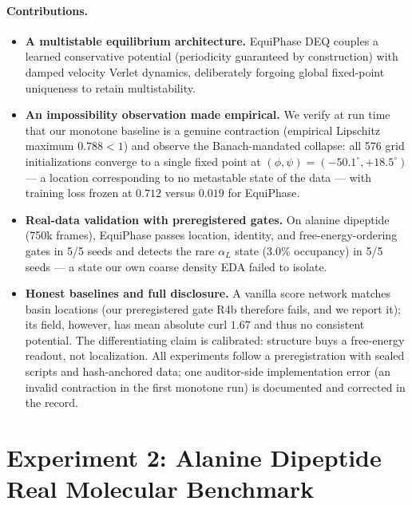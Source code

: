 \documentclass{article}
\begin{document}
\paragraph{Contributions.}
\begin{itemize}
\item \textbf{A multistable equilibrium architecture.} EquiPhase DEQ couples
a learned conservative potential (periodicity guaranteed by construction)
with damped velocity Verlet dynamics, deliberately forgoing global
fixed-point uniqueness to retain multistability.
\item \textbf{An impossibility observation made empirical.} We verify at run
time that our monotone baseline is a genuine contraction (empirical Lipschitz
maximum $0.788 < 1$) and observe the Banach-mandated collapse: all 576 grid
initializations converge to a single fixed point at
$(\phi,\psi)=(-50.1^\circ, +18.5^\circ)$ — a location corresponding to no
metastable state of the data — with training loss frozen at $0.712$ versus
$0.019$ for EquiPhase.
\item \textbf{Real-data validation with preregistered gates.} On alanine
dipeptide (750k frames), EquiPhase passes location, identity, and
free-energy-ordering gates in 5/5 seeds and detects the rare
$\alpha_L$ state (3.0\% occupancy) in 5/5 seeds — a state our own
coarse density EDA failed to isolate.
\item \textbf{Honest baselines and full disclosure.} A vanilla score network
matches basin locations (our preregistered gate R4b therefore fails, and we
report it); its field, however, has mean absolute curl $1.67$ and thus no
consistent potential. The differentiating claim is calibrated: structure buys
a free-energy readout, not localization. All experiments follow a
preregistration with sealed scripts and hash-anchored data; one auditor-side
implementation error (an invalid contraction in the first monotone run) is
documented and corrected in the record.
\end{itemize}





\section{Experiment 2: Alanine Dipeptide Real Molecular Benchmark}
\label{sec:ala2}
\end{document}
